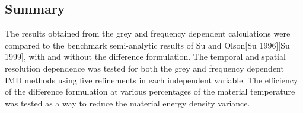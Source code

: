 % 

\belowSubSecSkip

\subsection{Summary}
\label{sec:Results-Summary}

\noindent
	\indent The results obtained from the grey and frequency dependent calculations were compared to the benchmark semi-analytic results of Su and Olson[Su 1996][Su 1999], with and without the difference formulation. The temporal and spatial resolution dependence was tested for both the grey and frequency dependent IMD methods using five refinements in each independent variable.  The efficiency of the difference formulation at various percentages of the material temperature was tested as a way to reduce the material energy density variance.











